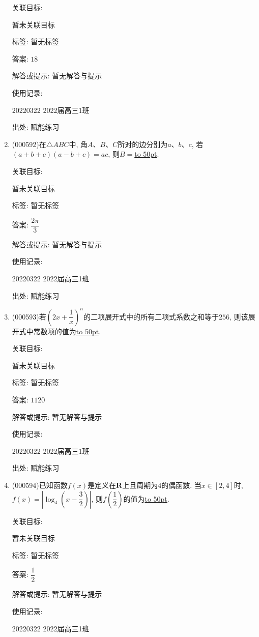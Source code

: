 \documentclass[10pt,a4paper]{article}
\newcommand{\blank}[1]{\underline{\hbox to #1pt{}}}
\begin{document}
\begin{enumerate}[1.]
关联目标:

暂未关联目标



标签: 暂无标签

答案: $18$

解答或提示: 暂无解答与提示

使用记录:

20220322	2022届高三1班	


出处: 赋能练习
\item { (000592)}在$\triangle ABC$中, 角$A$、$B$、$C$所对的边分别为$a$、$b$、$c$, 若$(a+b+c)(a-b+c)=ac$, 则$B=$\blank{50}.


关联目标:

暂未关联目标



标签: 暂无标签

答案: $\dfrac{2\pi }3$

解答或提示: 暂无解答与提示

使用记录:

20220322	2022届高三1班	


出处: 赋能练习
\item { (000593)}若$(2x+\dfrac 1x)^n$的二项展开式中的所有二项式系数之和等于$256$, 则该展开式中常数项的值为\blank{50}.


关联目标:

暂未关联目标



标签: 暂无标签

答案: $1120$

解答或提示: 暂无解答与提示

使用记录:

20220322	2022届高三1班	


出处: 赋能练习
\item { (000594)}已知函数$f(x)$是定义在$\mathbf{R}$上且周期为$4$的偶函数. 当$x\in [2,4]$时, $f(x)=\left|\log_4(x-\dfrac32)\right|$, 则$f(\dfrac12)$的值为\blank{50}.


关联目标:

暂未关联目标



标签: 暂无标签

答案: $\dfrac 12$

解答或提示: 暂无解答与提示

使用记录:

20220322	2022届高三1班	



\end{enumerate}
\end{document}
